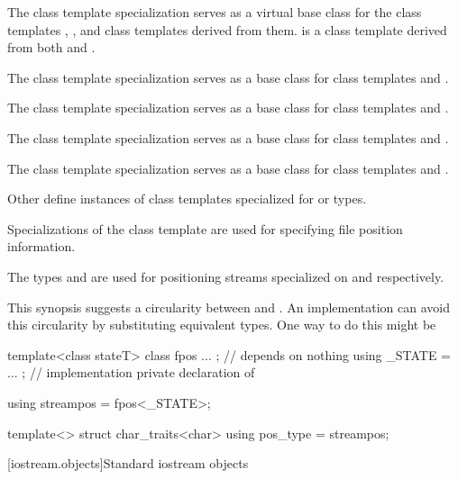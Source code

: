 \pnum
\begin{note}
The
class template specialization
serves as a virtual base class for the
class templates
,
,
and
class templates
derived from them.
is a class
template
derived from both
and
.

\pnum
The
class template specialization
serves as a base class for class templates
and
.

\pnum
The
class template specialization
serves as a base class for class templates
and
.

\pnum
The
class template specialization
serves as a base class for class templates
and
.

\pnum
The
class template specialization
serves as a base class for class templates
and
.

\pnum
Other  define instances of
class templates
specialized for
or
types.

\pnum
Specializations of the class template
are
used for specifying file position information.

\pnum
The types
and
are used for positioning streams specialized on
and
respectively.

\pnum
This synopsis suggests a circularity between
and
.
An implementation can avoid this circularity by substituting equivalent
types.
One way to do this might be
\begin{codeblock}
template<class stateT> class fpos { ... };      // depends on nothing
using _STATE = ... ;             // implementation private declaration of 

using streampos = fpos<_STATE>;

template<> struct char_traits<char> {
  using pos_type = streampos;
}
\end{codeblock}
\end{note}

[iostream.objects]{Standard iostream objects}

